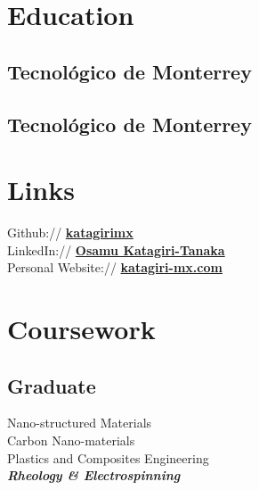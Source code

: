 \documentclass[]{deedy-resume-openfont}
\begin{document}
\begin{minipage}[t]{0.34\textwidth} 


\section{Education} 

\subsection{Tecnológico de Monterrey}
\sectionsep

\subsection{Tecnológico de Monterrey}
\sectionsep


\section{Links} 
Github:// \href{https://github.com/katagirimx}{\bf katagirimx} \\
LinkedIn:// \href{https://www.linkedin.com/in/osamu-k-84b2b940}{\bf Osamu Katagiri-Tanaka} \\
Personal Website:// \href{https://www.katagiri-mx.com/}{\bf katagiri-mx.com}


\section{Coursework}
\subsection{Graduate}
Nano-structured Materials \\
Carbon Nano-materials \\
Plastics and Composites Engineering \\
\textit{\textbf{Rheology \& Electrospinning}} \\
\sectionsep


\end{minipage}
\end{document}
